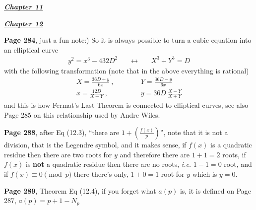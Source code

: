 \documentclass[aps,preprint,preprintnumbers,nofootinbib,showpacs,prd]{revtex4-1}
\newcommand{\ie}{{\it i.e.} }
\newcommand{\nbea}{\begin{eqnarray*}}
\newcommand{\neea}{\end{eqnarray*}}
\begin{document}
\bigskip
\underline{\textbf{\textit{Chapter 11}}}
\bigskip


\bigskip
\underline{\textbf{\textit{Chapter 12}}}
\bigskip

{\bf Page 284}, just a fun note:) So it is always possible to turn a cubic equation into an elliptical curve 
%
\nbea
y^2 = x^3 - 432D^2 & ~~~~~ \longleftrightarrow ~~~~~& X^3 + Y^3 = D
\neea
%
with the following transformation (note that in the above everything is rational)
%
\nbea
X = \frac{36D+y}{6x}~, &~~~~~~~~~~& Y = \frac{36D-y}{6x} \\
x = \frac{12D}{X+Y}~, &~~~~~~~~~~& y = 36D~\frac{X-Y}{X+Y}
\neea
%
and this is how Fermat's Last Theorem is connected to elliptical curves, see also Page 285 on this relationship used by Andre Wiles.

{\bf Page 288}, after Eq (12.3), ``there are $1 + \left(\frac{f(x)}{p}\right)$'', note that it is not a division, that is the Legendre symbol, and it makes sense, if $f(x)$ is a quadratic residue then there are two roots for $y$ and therefore there are $1+1=2$ roots, if $f(x)$ is {\bf not} a quadratic residue then there are no roots, \ie $1-1=0$ root, and if $f(x) \equiv 0 \pmod{p}$ there there's only, $1+0=1$ root for $y$ which is $y=0$.

{\bf Page 289}, Theorem Eq (12.4), if you forget what $a(p)$ is, it is defined on Page 287, $a(p) = p+1-N_p$
\end{document}
